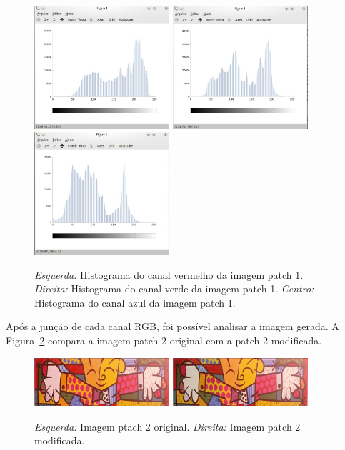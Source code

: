 \begin{figure}[h]
    \centering
    \includegraphics[width=5cm]{histPatch1Red.jpg}
    \includegraphics[width=5cm]{histPatch1Green.jpg}
    \includegraphics[width=5cm]{histPatch1Blue.jpg}     
    \caption{\emph{Esquerda:} Histograma do canal vermelho da imagem patch 1. \emph{Direita:} Histograma do canal verde da imagem patch 1. \emph{Centro:} Histograma do canal azul da imagem patch 1.}
    \label{fig:result4}
\end{figure}

Após a junção de cada canal RGB, foi possível analisar a imagem gerada. A Figura~\ref{fig:result5} compara a imagem patch 2 original com a patch 2 modificada.

\begin{figure}[h]
    \centering
    \includegraphics[width=5cm]{../data/img2_patch.jpg}
    \includegraphics[width=5cm]{../code/imagem_patch2_melhorada.jpg}
    \caption{\emph{Esquerda:} Imagem ptach 2 original. \emph{Direita:} Imagem patch 2 modificada.}
    \label{fig:result5}
\end{figure}


